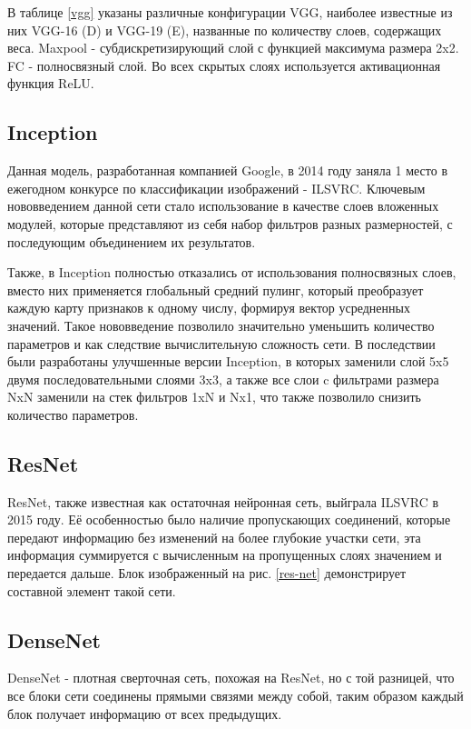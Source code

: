 В таблице \ref{vgg} указаны различные конфигурации VGG, наиболее известные из них VGG-16 (D) и VGG-19 (E), названные по количеству слоев, содержащих веса. Maxpool - субдискретизирующий слой с функцией максимума размера 2x2. FC - полносвязный слой. Во всех скрытых слоях используется активационная функция ReLU. 



\subsection{Inception}
Данная модель\cite{1512.00567}, разработанная компанией Google, в 2014 году заняла 1 место в ежегодном конкурсе по классификации изображений - ILSVRC. Ключевым нововведением данной сети стало использование в качестве слоев вложенных модулей, которые представляют из себя набор фильтров разных размерностей, с последующим объединением их результатов. 



Также, в Inception полностью отказались от использования полносвязных слоев, вместо них применяется глобальный средний пулинг, который преобразует каждую карту признаков к одному числу, формируя вектор усредненных значений. Такое нововведение позволило значительно уменьшить количество параметров и как следствие вычислительную сложность сети. В последствии были разработаны улучшенные версии Inception, в которых заменили слой 5x5 двумя последовательными слоями 3x3, а также все слои c фильтрами размера NxN заменили на стек фильтров 1xN и Nx1, что также позволило снизить количество параметров.

\subsection{ResNet}
ResNet\cite{ResNet}, также известная как остаточная нейронная сеть, выйграла ILSVRC в 2015 году. Её особенностью было наличие пропускающих соединений, которые передают информацию без изменений на более глубокие участки сети, эта информация суммируется с вычисленным на пропущенных слоях значением и передается дальше. Блок изображенный на рис. \ref{res-net} демонстрирует составной элемент такой сети.



\subsection{DenseNet}
DenseNet\cite{DenseNet} - плотная сверточная сеть, похожая на ResNet, но с той разницей, что все блоки сети соединены прямыми связями между собой, таким образом каждый блок получает информацию от всех предыдущих. 

